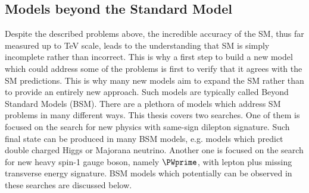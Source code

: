 
\subsection{Models beyond the Standard Model}
\label{subsec:bsm_models}
Despite the described problems above, the incredible accuracy of the SM, thus far measured up to TeV scale, leads to the understanding that SM 
is simply incomplete rather than incorrect. 
This is why a first step to build a new model which could address some of the problems is first to verify that it agrees with the SM predictions. 
This is why many new models aim to expand the SM rather than to provide an entirely new approach. Such models are typically called Beyond Standard Models (BSM).
There are a plethora of models which address SM problems in many different ways. 
This thesis covers two searches. One of them is focused on the search for new physics with same-sign dilepton signature. Such final state can be produced in many BSM models, e.g. models which predict double charged Higgs or Majorana neutrino. Another one is focused on the search for new heavy spin-1 gauge boson, namely $\PWprime$, with lepton plus missing transverse energy signature. BSM models which potentially can be observed in these searches are discussed below.

